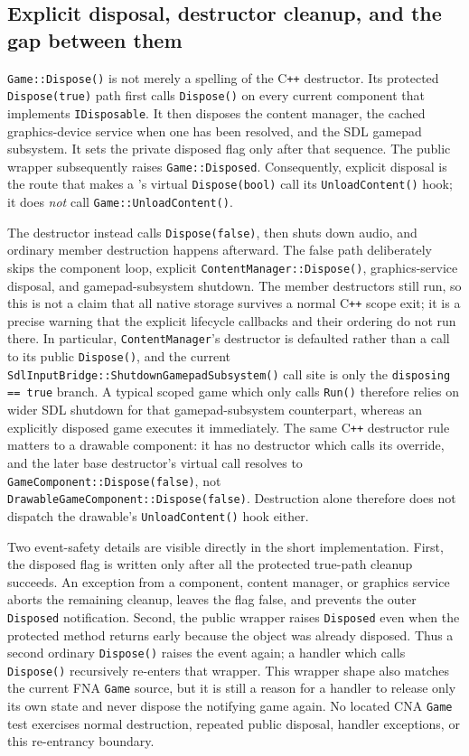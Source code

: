 \subsection{Explicit disposal, destructor cleanup, and the gap between them}

\texttt{Game::Dispose()} is not merely a spelling of the C\texttt{++} destructor. Its protected
\texttt{Dispose(true)} path first calls \texttt{Dispose()} on every current component that
implements \texttt{IDisposable}. It then disposes the content manager, the cached graphics-device
service when one has been resolved, and the SDL gamepad subsystem. It sets the private disposed
flag only after that sequence. The public wrapper subsequently raises \texttt{Game::Disposed}.
Consequently, explicit disposal is the route that makes a 's
virtual \texttt{Dispose(bool)} call its \texttt{UnloadContent()} hook; it does \emph{not} call
\texttt{Game::UnloadContent()}.

The destructor instead calls \texttt{Dispose(false)}, then shuts down audio, and ordinary member
destruction happens afterward. The false path deliberately skips the component loop, explicit
\texttt{ContentManager::Dispose()}, graphics-service disposal, and gamepad-subsystem shutdown.
The member destructors still run, so this is not a claim that all native storage survives a
normal C\texttt{++} scope exit; it is a precise warning that the explicit lifecycle callbacks and
their ordering do not run there. In particular, \texttt{ContentManager}'s destructor is defaulted
rather than a call to its public \texttt{Dispose()}, and the current
\texttt{SdlInputBridge::ShutdownGamepadSubsystem()} call site is only the \texttt{disposing ==
true} branch. A typical scoped game which only calls \texttt{Run()} therefore relies on wider SDL
shutdown for that gamepad-subsystem counterpart, whereas an explicitly disposed game executes it
immediately. The same C\texttt{++} destructor rule matters to a drawable component: it has no
destructor which calls its override, and the later  base destructor's
virtual call resolves to \texttt{GameComponent::Dispose(false)}, not
\texttt{DrawableGameComponent::Dispose(false)}. Destruction alone therefore does not dispatch the
drawable's \texttt{UnloadContent()} hook either.

Two event-safety details are visible directly in the short implementation. First, the disposed
flag is written only after all the protected true-path cleanup succeeds. An exception from a
component, content manager, or graphics service aborts the remaining cleanup, leaves the flag
false, and prevents the outer \texttt{Disposed} notification. Second, the public wrapper raises
\texttt{Disposed} even when the protected method returns early because the object was already
disposed. Thus a second ordinary \texttt{Dispose()} raises the event again; a handler which calls
\texttt{Dispose()} recursively re-enters that wrapper. This wrapper shape also matches the
current FNA \texttt{Game} source, but it is still a reason for a handler to release only its own
state and never dispose the notifying game again. No located CNA \texttt{Game} test exercises
normal destruction, repeated public disposal, handler exceptions, or this re-entrancy boundary.

